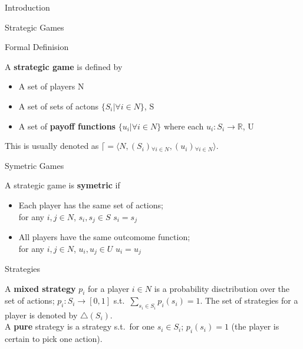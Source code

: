 \documentclass[12pt, letterpaper]{article}
\begin{document}
\begin{section}{Introduction}
\begin{subsection}{Strategic Games}
    \begin{subsubsection}{Formal Definision}

      A \textbf{strategic game} is defined by
      \begin{itemize}
        \item A set of players N
        \item A set of sets of actons \(\{S_{i} | \forall i \in N\}\), S
        \item A set of \textbf{payoff functions} \(\{u_{i} | \forall i \in
              N\}\) where each \(u_{i}: S_{i} \to \mathbb{R}\), U
      \end{itemize}

      This is usually denoted as \(\lceil = \langle N,
      (S_{i}){}_{\forall i \in N}, (u_{i}){}_{\forall i \in N} \rangle\).

    \end{subsubsection}

    \begin{subsubsection}{Symetric Games}

      A strategic game is \textbf{symetric} if
      \begin{itemize}
        \item Each player has the same set of actions; \\
              for any \(i, j \in N\), \(s_{i}, s_{j} \in S\) \(s_{i} = s_{j}\)
        \item All players have the same outcomome function; \\
              for any \(i, j \in N\), \(u_{i}, u_{j} \in U\) \(u_{i} = u_{j}\)
      \end{itemize}

    \end{subsubsection}

    \begin{subsubsection}{Strategies}

      A \textbf{mixed strategy} \(p_{i}\) for a player \(i \in N\) is a
      probability disctribution over the set of actions; \(p_{i} : S_{i} \to
      [0, 1]\) s.t.\ \(\sum_{s_{i} \in S_{i}} p_{i}(s_{i}) = 1\). The set of
      strategies for a player is denoted by \(\triangle (S_{i})\). \\
      A \textbf{pure} strategy is a strategy s.t.\ for one \(s_{i} \in S_{i}\);
      \(p_{i}(s_{i}) = 1\) (the player is certain to pick one action).

    \end{subsubsection}


\end{subsection}
\end{section}
\end{document}
